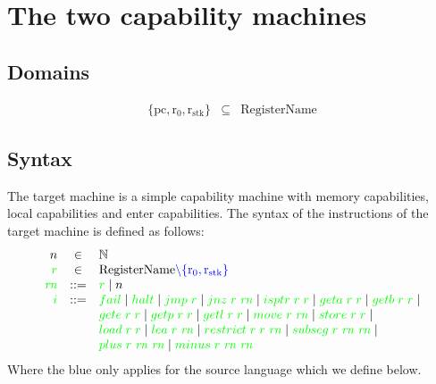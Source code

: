 \documentclass[a4paper]{article}
\newcommand{\sourcecolortext}{blue}
\newcommand{\sourcecolor}[1]{\color{blue}}
\newcommand{\src}[1]{{\sourcecolor{} #1}}
\newcommand{\targetcolor}[1]{\color{green}}
\newcommand{\trg}[1]{{\targetcolor{} #1}}
\newcommand{\zinstr}[1]{#1}
\newcommand{\oneinstr}[2]{
  \ifthenelse{\equal{#2}{}}
  {\zinstr{#1}}
  {\zinstr{#1} \; #2}
}
\newcommand{\twoinstr}[3]{
  \ifthenelse{\equal{#2#3}{}}
  {\zinstr{#1}}
  {\zinstr{#1} \; #2 \; #3}
}
\newcommand{\threeinstr}[4]{
  \ifthenelse{\equal{#2#3#4}{}}
  {\zinstr{#1}}
  {\zinstr{#1} \; #2 \; #3 \; #4}
}
\newcommand{\tfail}{\zinstr{\trg{fail}}}
\newcommand{\thalt}{\zinstr{\trg{halt}}}
\newcommand{\tjmp}[1]{\oneinstr{\trg{jmp}}{#1}}
\newcommand{\tjnz}[2]{\twoinstr{\trg{jnz}}{#1}{#2}}
\newcommand{\tisptr}[2]{\twoinstr{\trg{isptr}}{#1}{#2}}
\newcommand{\tgeta}[2]{\twoinstr{\trg{geta}}{#1}{#2}}
\newcommand{\tgetb}[2]{\twoinstr{\trg{getb}}{#1}{#2}}
\newcommand{\tgete}[2]{\twoinstr{\trg{gete}}{#1}{#2}}
\newcommand{\tgetp}[2]{\twoinstr{\trg{getp}}{#1}{#2}}
\newcommand{\tgetl}[2]{\twoinstr{\trg{getl}}{#1}{#2}}
\newcommand{\tmove}[2]{\twoinstr{\trg{move}}{#1}{#2}}
\newcommand{\tstore}[2]{\twoinstr{\trg{store}}{#1}{#2}}
\newcommand{\tload}[2]{\twoinstr{\trg{load}}{#1}{#2}}
\newcommand{\tlea}[2]{\twoinstr{\trg{lea}}{#1}{#2}}
\newcommand{\trestrict}[3]{\threeinstr{\trg{restrict}}{#1}{#2}{#3}}
\newcommand{\tsubseg}[3]{\threeinstr{\trg{subseg}}{#1}{#2}{#3}}
\newcommand{\tplus}[3]{\threeinstr{\trg{plus}}{#1}{#2}{#3}}
\newcommand{\tminus}[3]{\threeinstr{\trg{minus}}{#1}{#2}{#3}}
\newcommand{\plaindom}[1]{\mathrm{#1}}
\newcommand{\RegName}{\plaindom{RegisterName}}
\newcommand{\nats}{\mathbb{N}}
\newcommand{\var}[1]{\mathit{#1}}
\newcommand{\rn}{\var{rn}}
\newcommand{\pcreg}{\mathrm{pc}}
\newcommand{\rstk}{\mathrm{r}_\mathrm{stk}}
\newcommand{\rO}{\mathrm{r}_0}
\begin{document}
\section{The two capability machines}
\subsection{Domains}
\[
  \begin{array}{rcl}
    \{\pcreg,\rO,\rstk \} & \subseteq & \RegName
  \end{array}
\]

\subsection{Syntax}
The target machine is a simple capability machine with memory capabilities, local capabilities and enter capabilities. The syntax of the instructions of the target machine is defined as follows:
\[
\begin{array}{rcl}
n &\in & \nats \\
\trg{r} &\in &  \RegName  \src{\setminus \{\rO,\rstk\}}\\
\trg{\rn} &::= &  \trg{r} \mid n \\
\trg{i} &::= & \tfail \mid \thalt \mid \tjmp{\trg{r}} \mid \tjnz{\trg{r}}{\trg{\rn}} \mid \tisptr{\trg{r}}{\trg{r}} \mid \tgeta{\trg{r}}{\trg{r}} \mid \tgetb{\trg{r}}{\trg{r}} \mid \\
      & &  \tgete{\trg{r}}{\trg{r}}\mid \tgetp{\trg{r}}{\trg{r}} \mid \tgetl{\trg{r}}{\trg{r}} \mid \tmove{\trg{r}}{\trg{\rn}} \mid \tstore{\trg{r}}{\trg{r}} \mid\\
      & &  \tload{\trg{r}}{\trg{r}} \mid \tlea{\trg{r}}{\trg{\rn}} \mid \trestrict{\trg{r}}{\trg{r}}{\trg{\rn}} \mid \tsubseg{\trg{r}}{\trg{\rn}}{\trg{\rn}} \mid \\
      & & \tplus{\trg{r}}{\trg{\rn}}{\trg{\rn}} \mid \tminus{\trg{r}}{\trg{\rn}}{\trg{\rn}}
\end{array}
\]
Where the \sourcecolortext{} only applies for the source language which we define below.
\end{document}
